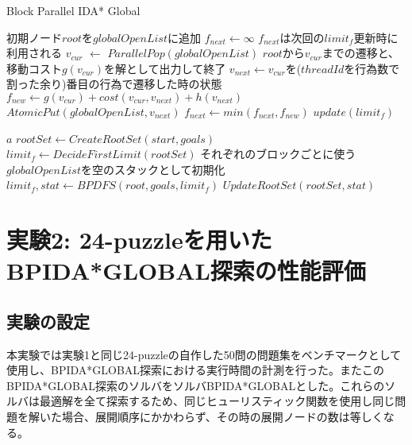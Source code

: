 \documentclass[a4paper,11pt,oneside,openany]{jsbook}
\begin{document}
\newpage
\begin{algorithm}
\caption{Block Parallel IDA* Global}
\label{alg:pbnf}
\begin{algorithmic}[1]
    \State 初期ノード$root$を$globalOpenList$に追加
    \State $f_{next} \leftarrow \infty$
    \State $f_{next}$は次回の$limit_f$更新時に利用される 
        \State $v_{cur}$ $\leftarrow$ ${ParallelPop}(globalOpenList)$
            \State $root$から$v_{cur}$までの遷移と、移動コスト$g(v_{cur})$を解として出力して終了
        \EndIf
        \State $v_{next} \gets $$v_{cur}$を($threadId$を行為数で割った余り)番目の行為で遷移した時の状態
        \State $f_{new} \leftarrow g(v_{cur}) + cost(v_{cur}, v_{next}) + h(v_{next})$
            \State ${AtomicPut}(globalOpenList, v_{next})$ 
        \Else
            \State $f_{next} \leftarrow min(f_{next}, f_{new})$
        \EndIf
    \EndWhile
    \State $update(limit_f)$

    \State \Return $a$
\EndFunction
{}
    \State $rootSet \gets {CreateRootSet}(start, goals)$
    \State $limit_f \leftarrow {DecideFirstLimit}(rootSet)$
    \State それぞれのブロックごとに使う$globalOpenList$を空のスタックとして初期化
            \State $limit_f, stat \gets {BPDFS}(root, goals, limit_f)$
        \EndParallelForByBlocks
        \State $UpdateRootSet(rootSet, stat)$
    \EndWhile
\EndFunction

\end{algorithmic}
\end{algorithm}
\newpage

\section{実験2: 24-puzzleを用いたBPIDA*GLOBAL探索の性能評価}
\subsection{実験の設定}
本実験では実験1と同じ24-puzzleの自作した50問の問題集をベンチマークとして使用し、BPIDA*GLOBAL探索における実行時間の計測を行った。またこのBPIDA*GLOBAL探索のソルバをソルバBPIDA*GLOBALとした。これらのソルバは最適解を全て探索するため、同じヒューリスティック関数を使用し同じ問題を解いた場合、展開順序にかかわらず、その時の展開ノードの数は等しくなる。
\end{document}
